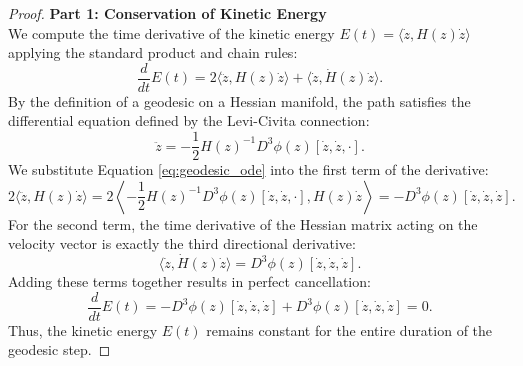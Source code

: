 \begin{proof}
\noindent \textbf{Part 1: Conservation of Kinetic Energy}\\
We compute the time derivative of the kinetic energy $E(t) = \langle \dot{z}, H(z)\dot{z} \rangle$ applying the standard product and chain rules:
\begin{equation}
    \frac{d}{dt} E(t) = 2 \langle \ddot{z}, H(z)\dot{z} \rangle + \langle \dot{z}, \dot{H}(z)\dot{z} \rangle.
\end{equation}
By the definition of a geodesic on a Hessian manifold, the path satisfies the differential equation defined by the Levi-Civita connection:
\begin{equation} \label{eq:geodesic_ode}
    \ddot{z} = -\frac{1}{2} H(z)^{-1} D^3\phi(z)[\dot{z}, \dot{z}, \cdot].
\end{equation}
We substitute Equation \ref{eq:geodesic_ode} into the first term of the derivative:
\begin{equation}
    2 \langle \ddot{z}, H(z)\dot{z} \rangle = 2 \left\langle -\frac{1}{2} H(z)^{-1} D^3\phi(z)[\dot{z}, \dot{z}, \cdot], H(z)\dot{z} \right\rangle = -D^3\phi(z)[\dot{z}, \dot{z}, \dot{z}].
\end{equation}
For the second term, the time derivative of the Hessian matrix acting on the velocity vector is exactly the third directional derivative:
\begin{equation}
    \langle \dot{z}, \dot{H}(z)\dot{z} \rangle = D^3\phi(z)[\dot{z}, \dot{z}, \dot{z}].
\end{equation}
Adding these terms together results in perfect cancellation:
\begin{equation}
    \frac{d}{dt} E(t) = -D^3\phi(z)[\dot{z}, \dot{z}, \dot{z}] + D^3\phi(z)[\dot{z}, \dot{z}, \dot{z}] = 0.
\end{equation}
Thus, the kinetic energy $E(t)$ remains constant for the entire duration of the geodesic step.

\vspace{0.5cm}


\end{proof}
